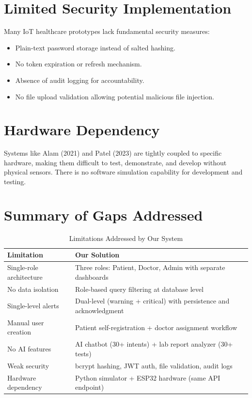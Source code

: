 \documentclass[12pt,a4paper]{report}
\begin{document}
\section{Limited Security Implementation}
Many IoT healthcare prototypes lack fundamental security measures:
\begin{itemize}[leftmargin=*]
    \item Plain-text password storage instead of salted hashing.
    \item No token expiration or refresh mechanism.
    \item Absence of audit logging for accountability.
    \item No file upload validation allowing potential malicious file injection.
\end{itemize}

\section{Hardware Dependency}
Systems like Alam (2021) and Patel (2023) are tightly coupled to specific hardware, making them difficult to test, demonstrate, and develop without physical sensors. There is no software simulation capability for development and testing.

\section{Summary of Gaps Addressed}
\begin{table}[H]
\centering
\caption{Limitations Addressed by Our System}
\label{tab:gaps}
\begin{tabular}{|p{5cm}|p{7cm}|}
\hline
\textbf{Limitation} & \textbf{Our Solution} \\
\hline
Single-role architecture & Three roles: Patient, Doctor, Admin with separate dashboards \\
\hline
No data isolation & Role-based query filtering at database level \\
\hline
Single-level alerts & Dual-level (warning + critical) with persistence and acknowledgment \\
\hline
Manual user creation & Patient self-registration + doctor assignment workflow \\
\hline
No AI features & AI chatbot (30+ intents) + lab report analyzer (30+ tests) \\
\hline
Weak security & bcrypt hashing, JWT auth, file validation, audit logs \\
\hline
Hardware dependency & Python simulator + ESP32 hardware (same API endpoint) \\
\hline
\end{tabular}
\end{table}
\end{document}
